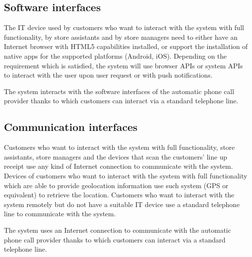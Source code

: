 \documentclass[../../main.tex]{subfiles}
\begin{document}
\subsection{Software interfaces}

The IT device used by customers who want to interact with the system with full
functionality, by store assistants and by store managers need to either have an
Internet browser with HTML5 capabilities installed, or support the installation
of native apps for the supported platforms (Android, iOS). Depending on the
requirement which is satisfied, the system will use browser APIs or system APIs
to interact with the user upon user request or with push notifications.

The system interacts with the software interfaces of the automatic phone call
provider thanks to which customers can interact via a standard telephone line.

\subsection{Communication interfaces}

Customers who want to interact with the system with full functionality, store
assistants, store managers and the devices that scan the customers' line up
receipt use any kind of Internet connection to communicate with the system.
Devices of customers who want to interact with the system with full
functionality which are able to provide geolocation information use such system
(GPS or equivalent) to retrieve the location. Customers who want to interact
with the system remotely but do not have a suitable IT device use a standard
telephone line to communicate with the system.

The system uses an Internet connection to communicate with the automatic phone
call provider thanks to which customers can interact via a standard telephone
line.
\end{document}
